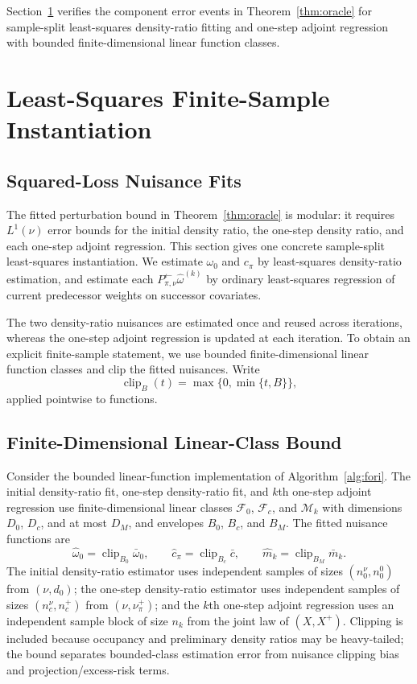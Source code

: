 \documentclass{article}
\newcommand{\sF}{\mathcal{F}}
\newcommand{\sM}{\mathcal{M}}
\newcommand{\mhat}{\widehat m}
\newcommand{\1}{\mathbf{1}}
\newcommand{\nup}{\nu_\pi^+}
\newcommand{\cpi}{c_\pi}
\newcommand{\omegazero}{\omega_0}
\newcommand{\omegahatzero}{\widehat{\omega}_0}
\newcommand{\Pback}{P_{\pi,\nu}^{\leftarrow}}
\newcommand{\Mpi}{\Pback}
\newcommand{\dinit}{d_0}
\newcommand{\omegahat}{\widehat{\omega}}
\newcommand{\chat}{\widehat{c}_\pi}
\newcommand{\Clip}{\operatorname{clip}}
\theoremstyle{plain}
\theoremstyle{definition}
\theoremstyle{remark}
\begin{document}
Section~\ref{sec:finite-sample-ls} verifies the component error events in
Theorem~\ref{thm:oracle} for sample-split least-squares density-ratio fitting and
one-step adjoint regression with bounded finite-dimensional linear function classes.

\section{Least-Squares Finite-Sample Instantiation}
\label{sec:finite-sample-ls}

\subsection{Squared-Loss Nuisance Fits}

The fitted perturbation bound in Theorem~\ref{thm:oracle} is modular: it requires
$L^1(\nu)$ error bounds for the initial density ratio, the one-step density ratio, and each
one-step adjoint regression. This section gives one concrete sample-split least-squares
instantiation. We estimate $\omegazero$ and $\cpi$ by least-squares density-ratio
estimation, and estimate each $\Mpi\omegahat^{(k)}$ by ordinary least-squares
regression of current predecessor weights on successor covariates.

The two density-ratio nuisances are estimated once and reused across iterations,
whereas the one-step adjoint regression is updated at each iteration. To obtain an
explicit finite-sample statement, we use bounded finite-dimensional linear
function classes and clip the fitted nuisances. Write
\[
    \Clip_B(t)=\max\{0,\min\{t,B\}\},
\]
applied pointwise to functions.



\subsection{Finite-Dimensional Linear-Class Bound}

Consider the bounded linear-function implementation of Algorithm~\ref{alg:fori}.
The initial density-ratio fit, one-step density-ratio fit, and $k$th one-step adjoint regression use
finite-dimensional linear classes $\sF_0$, $\sF_c$, and $\sM_k$ with dimensions
$D_0$, $D_c$, and at most $D_M$, and envelopes $B_0$, $B_c$, and $B_M$. The fitted nuisance functions are
\[
    \omegahatzero=\Clip_{B_0}\bar\omega_0,
    \qquad
    \chat=\Clip_{B_c}\bar c,
    \qquad
    \mhat_k=\Clip_{B_M}\bar m_k .
\]
The initial density-ratio estimator uses independent samples of sizes
$(n_0^\nu,n_0^0)$ from $(\nu,\dinit)$; the one-step density-ratio estimator uses
independent samples of sizes $(n_c^\nu,n_c^+)$ from $(\nu,\nup)$; and the
$k$th one-step adjoint regression uses an independent sample block of size $n_k$ from
the joint law of $(X,X^+)$. Clipping is included because occupancy and preliminary density
ratios may be heavy-tailed; the bound separates bounded-class estimation error
from nuisance clipping bias and projection/excess-risk terms.
\end{document}
